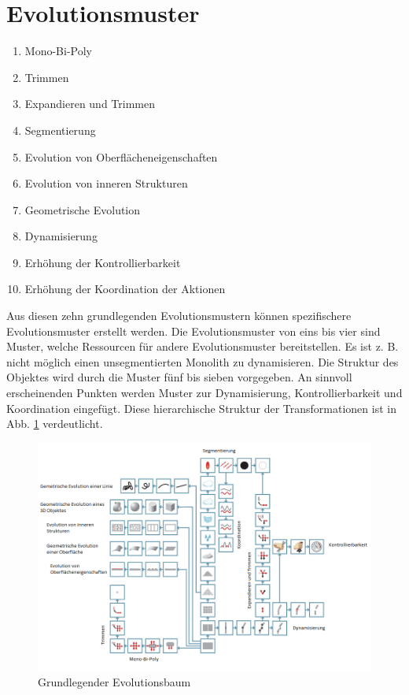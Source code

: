 \documentclass[11pt,a4paper]{article}
\begin{document}
\section{Evolutionsmuster}

\begin{enumerate}
    \item Mono-Bi-Poly
    \item Trimmen
    \item Expandieren und Trimmen
    \item Segmentierung
    \item Evolution von Oberflächeneigenschaften
    \item Evolution von inneren Strukturen
    \item Geometrische Evolution
    \item Dynamisierung
    \item Erhöhung der Kontrollierbarkeit
    \item Erhöhung der Koordination der Aktionen
\end{enumerate}

Aus diesen zehn grundlegenden Evolutionsmustern können spezifischere Evolutionsmuster erstellt werden. Die Evolutionsmuster von eins bis vier sind Muster, welche Ressourcen für andere Evolutionsmuster bereitstellen. Es ist z. B. nicht möglich einen unsegmentierten Monolith zu dynamisieren. Die Struktur des Objektes wird durch die Muster fünf bis sieben vorgegeben. An sinnvoll erscheinenden Punkten werden Muster zur Dynamisierung, Kontrollierbarkeit und Koordination eingefügt. Diese hierarchische Struktur der Transformationen ist in Abb. \ref{fig:basic_evo} verdeutlicht.

\begin{figure}[htb]
	\centering
	\includegraphics[width=0.9\linewidth]{figures/Basisevolutionsbaum2.png}
	\caption{\small Grundlegender Evolutionsbaum \cite{evo}}
	\label{fig:basic_evo}
\end{figure}
\end{document}
